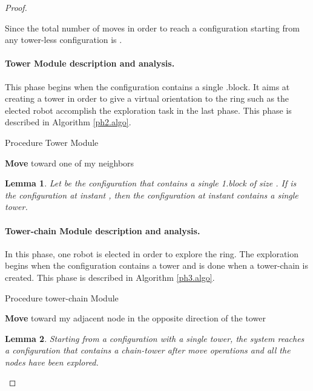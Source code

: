 \documentclass[12pt]{llncs}
\newtheorem{lem}{Lemma}
\begin{document}
\begin{proof}
\begin{enumerate}
\begin{itemize}
\end{itemize}
\end{enumerate}







Since  the total number of moves in order to reach a  configuration starting from any tower-less configuration is  .

\paragraph{Tower Module description and analysis.}\label{sec:ph2}

This phase begins when the configuration contains a single .block. It aims at creating a tower in order to give a virtual orientation to the ring such as the elected robot accomplish the exploration task in the last phase. 
This phase is described in Algorithm \ref{ph2.algo}.
{\footnotesize
\begin{algorithm}[htbp]
  \caption{Procedure Tower Module}
  \label{ph2.algo}
 \begin{algorithmic}[1]
    \State \textbf{Move} toward one of my neighbors
\EndIf
  \end{algorithmic}
\end{algorithm} 
}
\begin{lem}
\label{lem:tower}
Let  be the configuration that contains a single 1.block of size . If  is the configuration at instant , then the configuration at instant  contains a single tower. 
\end{lem}

\paragraph{Tower-chain Module description and analysis.}\label{sec:ph3}
In this phase, one robot is elected in order to explore the ring. The exploration begins when the configuration contains a tower and is done when a tower-chain is created. This phase is described in Algorithm \ref{ph3.algo}.
{\footnotesize
\begin{algorithm}[htbp]
  \caption{ Procedure tower-chain Module}
  \label{ph3.algo}
 \begin{algorithmic}[1]
        \State \textbf{Move} toward my adjacent node in the opposite direction of the tower 
       \EndIf 
      \EndIf
       \end{algorithmic}
\end{algorithm} 
}
\begin {lem}
\label{lem:ph3}
Starting from a configuration with a single tower, the system reaches a configuration that contains a chain-tower after  move operations and all the nodes have been explored.
\end {lem}



\end{proof}
\end{document}
